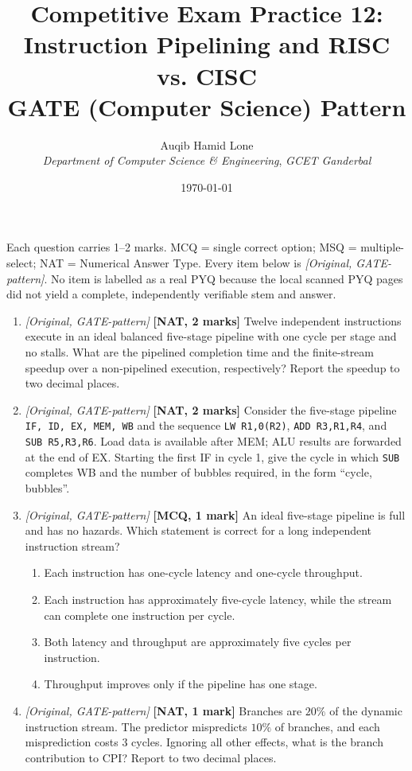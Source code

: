 \documentclass[11pt]{article}
\title{Competitive Exam Practice 12: Instruction Pipelining and RISC vs. CISC\\
  \large GATE (Computer Science) Pattern}
\author{Auqib Hamid Lone\\[0.3em]
  \emph{Department of Computer Science \& Engineering}, \emph{GCET Ganderbal}}
\date{\today}
\begin{document}
\maketitle

\noindent Each question carries 1--2 marks. MCQ = single correct option;
MSQ = multiple-select; NAT = Numerical Answer Type. Every item below is
\textit{[Original, GATE-pattern]}. No item is labelled as a real PYQ because
the local scanned PYQ pages did not yield a complete, independently verifiable
stem and answer.

\begin{enumerate}
\item[\textbf{Q1}] \textit{[Original, GATE-pattern]} \textbf{[NAT, 2 marks]}
Twelve independent instructions execute in an ideal balanced five-stage
pipeline with one cycle per stage and no stalls. What are the pipelined
completion time and the finite-stream speedup over a non-pipelined execution,
respectively? Report the speedup to two decimal places.

\item[\textbf{Q2}] \textit{[Original, GATE-pattern]} \textbf{[NAT, 2 marks]}
Consider the five-stage pipeline \texttt{IF, ID, EX, MEM, WB} and the sequence
\texttt{LW R1,0(R2)}, \texttt{ADD R3,R1,R4}, and \texttt{SUB R5,R3,R6}.
Load data is available after MEM; ALU results are forwarded at the end of EX.
Starting the first IF in cycle 1, give the cycle in which \texttt{SUB} completes
WB and the number of bubbles required, in the form ``cycle, bubbles''.

\item[\textbf{Q3}] \textit{[Original, GATE-pattern]} \textbf{[MCQ, 1 mark]}
An ideal five-stage pipeline is full and has no hazards. Which statement is
correct for a long independent instruction stream?
\begin{enumerate}
  \item[(A)] Each instruction has one-cycle latency and one-cycle throughput.
  \item[(B)] Each instruction has approximately five-cycle latency, while
    the stream can complete one instruction per cycle.
  \item[(C)] Both latency and throughput are approximately five cycles per
    instruction.
  \item[(D)] Throughput improves only if the pipeline has one stage.
\end{enumerate}

\item[\textbf{Q4}] \textit{[Original, GATE-pattern]} \textbf{[NAT, 1 mark]}
Branches are $20\%$ of the dynamic instruction stream. The predictor
mispredicts $10\%$ of branches, and each misprediction costs 3 cycles. Ignoring
all other effects, what is the branch contribution to CPI? Report to two
decimal places.


\end{enumerate}
\end{document}

